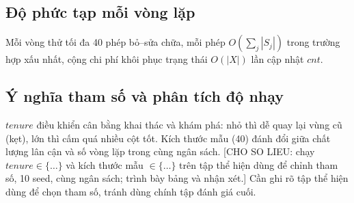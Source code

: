 \subsection{Độ phức tạp mỗi vòng lặp}
Mỗi vòng thử tối đa 40 phép bỏ--sửa chữa, mỗi phép $O(\sum_j|S_j|)$ trong trường hợp xấu nhất, cộng chi phí khôi phục trạng thái $O(|X|)$ lần cập nhật $cnt$.

\subsection{Ý nghĩa tham số và phân tích độ nhạy}
$tenure$ điều khiển cân bằng khai thác và khám phá: nhỏ thì dễ quay lại vùng cũ (kẹt), lớn thì cấm quá nhiều cột tốt.
Kích thước mẫu (40) đánh đổi giữa chất lượng lân cận và số vòng lặp trong cùng ngân sách.
[CHO SO LIEU: chạy $tenure\in\{\ldots\}$ và kích thước mẫu $\in\{\ldots\}$ trên tập thể hiện dùng để chỉnh tham số, 10 seed, cùng ngân sách; trình bày bảng và nhận xét.]
Cần ghi rõ tập thể hiện dùng để chọn tham số, tránh dùng chính tập đánh giá cuối.
